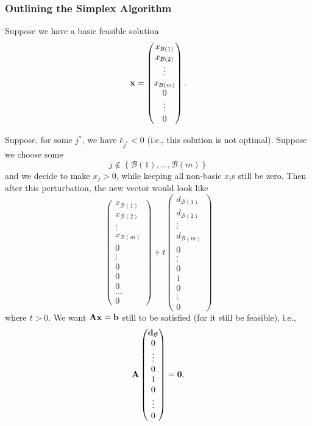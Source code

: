 \documentclass[11pt]{article}
\theoremstyle{definition}
\theoremstyle{remark}
\newcommand{\pqty}[1]{\left(#1\right)}
\newcommand{\Bqty}[1]{\left\{#1\right\}}
\newcommand{\pmqty}[1]{\begin{pmatrix}#1\end{pmatrix}}
\begin{document}
\subsubsection{Outlining the Simplex Algorithm}

Suppose we have a basic feasible solution
\[
    \vb{x} = \pmqty{
        x_{\mathcal{B}\pqty{1}} \\
        x_{\mathcal{B}\pqty{2}} \\
        \vdots \\
        x_{\mathcal{B}\pqty{m}} \\
        0 \\
        \vdots \\
        0}.
\]

Suppose, for some \(j^{\ast}\), we have \(\bar{c}_{j^{\ast}} < 0\) (i.e., this solution is not optimal). Suppose we choose some
\[
    j \notin \Bqty{\mathcal{B}\pqty{1}, \ldots, \mathcal{B}\pqty{m}}
\]
and we decide to make \(x_j > 0\), while keeping all non-basic \(x_i\)s still be zero. Then after this perturbation, the new vector would look like
\[
   \pmqty{
        x_{\mathcal{B}\pqty{1}} \\
        x_{\mathcal{B}\pqty{2}} \\
        \vdots \\
        x_{\mathcal{B}\pqty{m}} \\
        0 \\
        \vdots \\
        0 \\
        0 \\ 
        0 \\
        \ldots \\
        0}
    + t \pmqty{
        d_{\mathcal{B}\pqty{1}} \\
        d_{\mathcal{B}\pqty{2}} \\
        \vdots \\
        d_{\mathcal{B}\pqty{m}} \\
        0 \\
        \vdots \\
        0 \\
        1 \\
        0 \\
        \vdots \\
        0}
\]
where \(t > 0\). We want \(\vb{Ax} = \vb{b}\) still to be satisfied (for it still be feasible), i.e.,
\[
    \vb{A} \pmqty{\vb{d}_{\mathcal{B}} \\ 0 \\ \vdots \\ 0 \\ 1 \\ 0 \\ \vdots \\ 0} = \vb{0}.
\]
\end{document}
